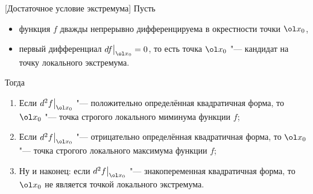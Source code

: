 [Достаточное условие экстремума]
	 Пусть 
	 \begin{itemize}
	   \item функция $f$ дважды непрерывно дифференцируема в окрестности точки $\ol x_0$,
	   \item первый дифференциал $df\big|_{\ol x_0} = 0$, то есть точка $\ol x_0$ "--- кандидат на точку локального экстремума.
	 \end{itemize}
	
 Тогда 
	 \begin{enumerate}
	   \item  \label{1080} Если $d^2f\big|_{\ol x_0}$ "--- положительно определённая квадратичная форма, то $\ol x_0$ "--- точка строгого локального миминума функции $f$;
	   \item  \label{1052} Если $d^2f\big|_{\ol x_0}$ "--- отрицательно определённая квадратичная форма, то $\ol x_0$ "--- точка строгого локального максимума функции $f$;
	   \item  \label{1056} Ну и наконец: если $d^2f\big|_{\ol x_0}$ "--- знакопеременная квадратичная форма, то $\ol x_0$ не является точкой локального экстремума.
	 \end{enumerate}
	 